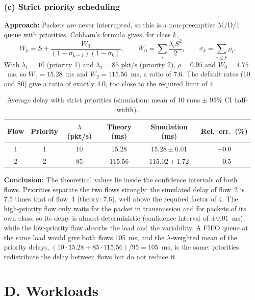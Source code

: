 ﻿\documentclass[12pt]{article}
\begin{document}
\subsubsection{(c) Strict priority scheduling}

\textbf{Approach:} Packets are never interrupted, so this is a non-preemptive
M/D/1 queue with priorities. Cobham's formula gives, for class $k$,
\[
W_k = S + \frac{W_0}{(1-\sigma_{k-1})(1-\sigma_k)}, \qquad
W_0=\sum_i\frac{\lambda_i S^2}{2}, \qquad \sigma_k=\sum_{i\le k}\rho_i .
\]
With $\lambda_1=10$ (priority 1) and $\lambda_2=85$ pkt/s (priority 2),
$\rho=0.95$ and $W_0=4.75$~ms, so $W_1=15.28$~ms and $W_2=115.56$~ms, a ratio of
7.6. The default rates (10 and 80) give a ratio of exactly 4.0, too close to the
required limit of 4.

\begin{table}[H]
    \centering
    \caption{Average delay with strict priorities (simulation: mean of 10 runs $\pm$ 95\% CI half-width).}
    \label{tab:ppl-prio}
    \begin{tabular}{ccc|ccc}
        Flow & Priority & $\lambda$ (pkt/s) & Theory (ms) & Simulation (ms) & Rel.\ err.\ (\%) \\
        \hline
        1 & 1 & 10 & 15.28  & $15.28\pm0.01$  & $+0.0$ \\
        2 & 2 & 85 & 115.56 & $115.02\pm1.72$ & $-0.5$ \\
    \end{tabular}
\end{table}

\textbf{Conclusion:} The theoretical values lie inside the confidence intervals
of both flows. Priorities separate the two flows strongly: the simulated delay
of flow~2 is 7.5 times that of flow~1 (theory: 7.6), well above the required
factor of 4. The high-priority flow only waits for the packet in transmission and
for packets of its own class, so its delay is almost deterministic (confidence
interval of $\pm0.01$~ms), while the low-priority flow absorbs the load and the
variability. A FIFO queue at the same load would give both flows 105~ms, and the
$\lambda$-weighted mean of the priority delays,
$(10\cdot15.28+85\cdot115.56)/95=105$~ms, is the same: priorities redistribute
the delay between flows but do not reduce it.

\section{D. Workloads}\label{sec:D}
\end{document}
